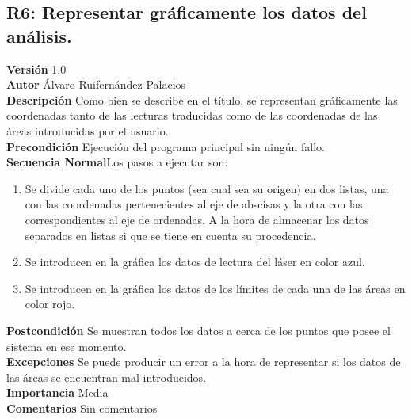 \subsection{R6: Representar gráficamente los datos del análisis.}
\textbf{Versión} 1.0\\
\textbf{Autor} Álvaro Ruifernández Palacios\\
\textbf{Descripción} Como bien se describe en el título, se representan gráficamente las coordenadas tanto de las lecturas traducidas como de las coordenadas de las áreas introducidas por el usuario.\\
\textbf{Precondición} Ejecución del programa principal sin ningún fallo.\\
\textbf{Secuencia Normal}Los pasos a ejecutar son:
\begin{enumerate}
	\item Se divide cada uno de los puntos (sea cual sea su origen) en dos listas, una con las coordenadas pertenecientes al eje de abscisas y la otra con las correspondientes al eje de ordenadas. A la hora de almacenar los datos separados en listas si que se tiene en cuenta su procedencia.
	\item Se introducen en la gráfica los datos de lectura del láser en color azul.
	\item Se introducen en la gráfica los datos de los límites de cada una de las áreas en color rojo.
\end{enumerate}
\textbf{Postcondición} Se muestran todos los datos a cerca de los puntos que posee el sistema en ese momento.\\
\textbf{Excepciones} Se puede producir un error a la hora de representar si los datos de las áreas se encuentran mal introducidos.\\
\textbf{Importancia} Media\\
\textbf{Comentarios} Sin comentarios\\

